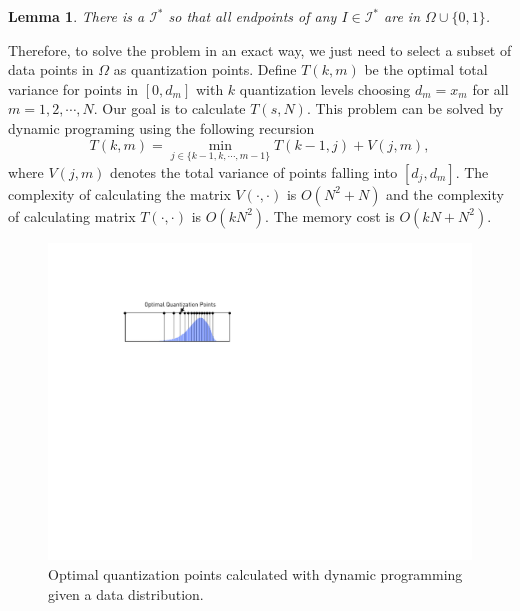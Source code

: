 \documentclass{article}
\newcommand{\err}{\ensuremath{\mathrm{err}}}
\newcommand{\setI}{\mathcal{I}}
\newtheorem{lemma}{Lemma}
\begin{document}
\begin{lemma}
\label{lem:discrete}
There is a $\setI^*$ so that all endpoints of any $I \in \setI^*$ are in $\Omega \cup \{0, 1\}$.
\end{lemma}

\vspace{-0.5em}
Therefore, to solve the problem in an exact way, we just need to select a subset of data points in $\Omega$ as quantization points. Define $T(k, m)$ be the optimal total variance for points in $[0, d_m]$ with $k$ quantization levels choosing $d_m=x_m$ for all $m=1,2,\cdots, N$. Our goal is to calculate $T(s, N)$. This problem can be solved by dynamic programing using the following recursion
\[
T(k, m) = \min_{j\in \{k-1, k, \cdots, m-1\}} T(k-1,j) + V(j,m),
\]
where $V(j,m)$ denotes the total variance of points falling into $[d_j, d_m]$. The complexity of calculating the matrix $V(\cdot, \cdot)$ is $O(N^2 + N)$ and the complexity of calculating matrix $T(\cdot, \cdot)$ is $O(kN^2)$. The memory cost is $O(kN + N^2)$. 

\begin{figure}[t]
\centering    
\includegraphics[width=0.5\columnwidth]{micro-experiments/dp-level.pdf} 
\vspace{-1em}
\caption{Optimal quantization points calculated with
dynamic programming given a data distribution. }
\vspace{-1em}
\label{fig:optimalquantization}
\end{figure} 
\end{document}
